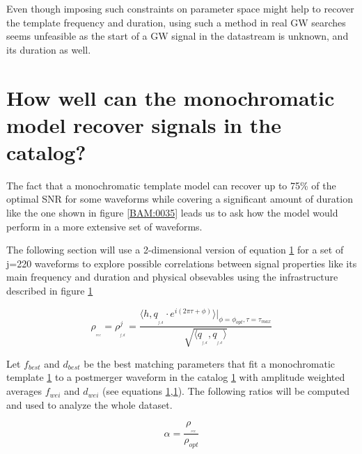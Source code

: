 Even though imposing such constraints on parameter space might help to recover the template frequency and duration, using such a method in real GW searches seems unfeasible as the start of a GW signal in the datastream is unknown, and its duration as well.

\newpage
\section{How well can the monochromatic model recover signals in the catalog?}


The fact that a monochromatic template model can recover up to 75\% of the optimal SNR for some waveforms while covering a significant amount of duration like the one shown in figure \ref{BAM:0035} leads us to ask how the model would perform in a more extensive set of waveforms. 


The following section will use a 2-dimensional version of equation \ref{} for a set of j=220 waveforms to explore possible correlations between signal properties like its main frequency and duration and physical obsevables  using the infrastructure described in figure \ref{}

\begin{equation}\label{eq:21}
\rho_{_{_{rec}}} = \rho^j_{_{_{f,d}}} = \frac{\langle h, q_{_{_{f,d}}}\cdot e^{i(2\pi \tau+\phi)}\rangle \bigg\rvert_{\phi =\phi_{opt},\tau =\tau_{max}}}{\sqrt{\langle  q_{_{_{f,d}}},q_{_{_{f,d}}} \rangle}}
\end{equation}




Let $f_{best}$ and $d_{best}$ be the best matching parameters that fit a monochromatic template \ref{} to a postmerger waveform in the catalog \ref{} with amplitude weighted averages $f_{wei}$ and $d_{wei}$ (see equations \ref{},\ref{}). The following ratios will be computed and used to analyze the whole dataset. 


\begin{equation}\label{alpha}
\alpha = \frac{\rho_{_{_{rec}}}}{\rho_{opt}}
\end{equation}

